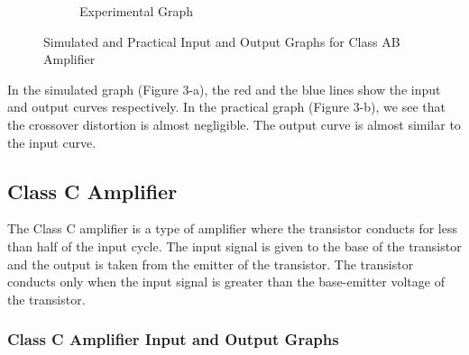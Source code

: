 \documentclass[12pt]{article}
\begin{document}
\begin{figure}[h!]
\begin{subfigure}{0.55\textwidth}
        \caption{Experimental Graph}
    \end{subfigure}
    \caption{Simulated and Practical Input and Output Graphs for Class AB Amplifier}
\end{figure}

In the simulated graph (Figure 3-a), the red and the blue lines show the input and output curves respectively. In the practical graph (Figure 3-b), we see that the crossover distortion is almost negligible. The output curve is almost similar to the input curve.

\subsection{Class C Amplifier}
The Class C amplifier is a type of amplifier where the transistor conducts for less than half of the input cycle. The input signal is given to the base of the transistor and the output is taken from the emitter of the transistor. The transistor conducts only when the input signal is greater than the base-emitter voltage of the transistor.

\subsubsection{Class C Amplifier Input and Output Graphs}
\end{document}
